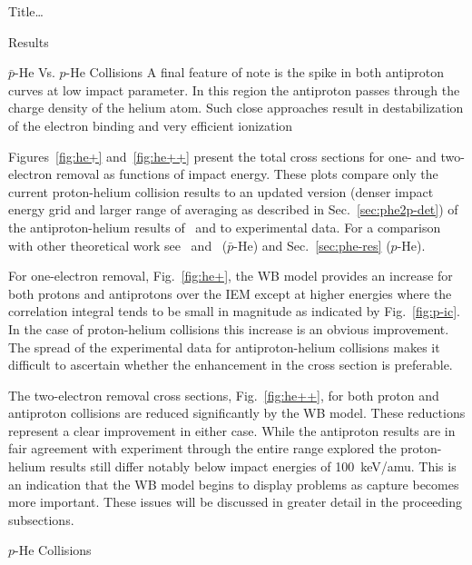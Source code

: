 \documentclass[letterpaper, 11 pt]{report}
\begin{document}
\begin{chapter}{ Title\dots \label{chap:p-he2p-he}}
\begin{section}{Results \label{sec:phe2p-res}}
\begin{subsection}{ \texorpdfstring{$\bar{p}$}{pbar}-He Vs. \texorpdfstring{$p$}{p}-He Collisions
                         \label{sec:pbarhe-res}}
         A final feature of note is the spike in both antiproton curves at low impact parameter. In this
         region the antiproton passes through the charge density of the helium atom. Such close
         approaches result in destabilization of the electron binding and very efficient
         ionization~\cite{pbarhe-rev}

         Figures~\ref{fig:he+} and~\ref{fig:he++} present the total cross sections for one- and
         two-electron removal as functions of impact energy. These plots compare only the current
         proton-helium collision results to an updated version (denser impact energy grid and larger
         range of averaging as described in Sec.~\ref{sec:phe2p-det}) of the antiproton-helium results
         of~\cite{pbarhe} and to experimental data. For a comparison with other theoretical work
         see~\cite{pbarhe} and~\cite{new-pbarhe} ($\bar{p}$-He) and Sec.~\ref{sec:phe-res} ($p$-He).
   
         For one-electron removal, Fig.~\ref{fig:he+}, the WB model provides an increase for both protons
         and antiprotons over the IEM except at higher energies where the correlation integral tends to
         be small in magnitude as indicated by Fig.~\ref{fig:p-ic}. In the case of proton-helium
         collisions this increase is an obvious improvement. The spread of the experimental data for
         antiproton-helium collisions makes it difficult to ascertain whether the enhancement in the
         cross section is preferable.
   
         The two-electron removal cross sections, Fig.~\ref{fig:he++}, for both proton and antiproton
         collisions are reduced significantly by the WB model. These reductions represent a clear
         improvement in either case. While the antiproton results are in fair agreement with experiment
         through the entire range explored the proton-helium results still differ notably below impact
         energies of 100~keV/amu. This is an indication that the WB model begins to display problems as
         capture becomes more important. These issues will be discussed in greater detail in the
         proceeding subsections.

      \end{subsection}

      \begin{subsection}{\texorpdfstring{$p$}{p}-He Collisions \label{sec:phe-res}}

         \begin{figure}[ht]
            \begin{minipage}{.49\linewidth}
               

\end{minipage}
\end{figure}
\end{subsection}
\end{section}
\end{chapter}
\end{document}
